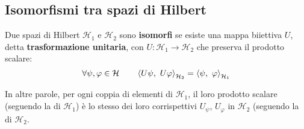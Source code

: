 \documentclass[FisicaTeorica.tex]{subfiles}
\begin{document}
\subsection{Isomorfismi tra spazi di Hilbert}
\begin{dfn}
Due spazi di Hilbert $\mathcal{H}_1$ e $\mathcal{H}_2$ sono \textbf{isomorfi} se esiste una mappa biiettiva $U$, detta \textbf{trasformazione unitaria}, con $U:\mathcal{H}_1\rightarrow\mathcal{H}_2$ che preserva il prodotto scalare:
\[
	\forall \psi, \varphi \in \hs \qquad \left\langle U\psi,\ U\varphi\right\rangle_{\mathcal{H}_2}=\left\langle\psi,\ \varphi\right\rangle_{\mathcal{H}_1}
\]
\end{dfn}
In altre parole, per ogni coppia di elementi di $\mathcal{H}_1$, il loro prodotto scalare (seguendo la  di $\mathcal{H}_1$) è lo stesso dei loro corrispettivi $U_\psi$, $U_\varphi$ in $\mathcal{H}_2$ (seguendo la  di $\mathcal{H}_2$.
\end{document}
